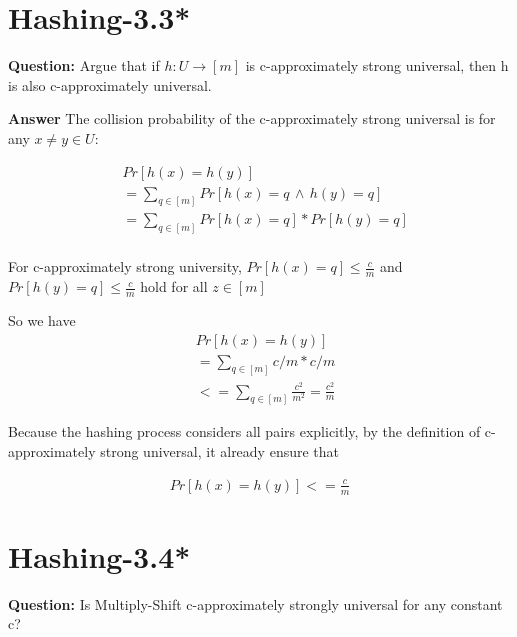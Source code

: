 \documentclass[12pt]{article}
\begin{document}
\section{Hashing-3.3* }
\textbf{Question: }
Argue that if $h: U \rightarrow [m]$ is c-approximately strong universal, then h is also c-approximately universal.

\textbf{Answer}
The collision probability of the c-approximately strong universal is for any $x \neq y \in U$:

\begin{equation}
\begin{aligned}
&Pr[h(x)=h(y)] \\
&= \sum_{q \in [m]} Pr[h(x) = q \, \land \, h(y) = q]\\
&=\sum_{q \in [m]} Pr[h(x) = q] * Pr[h(y) = q]\\
\end{aligned}
\end{equation}

For c-approximately strong university, $Pr[h(x) = q] \leq \frac{c}{m}$ and $Pr[h(y) = q] \leq \frac{c}{m}$ hold for all $z \in [m]$

So we have
\begin{equation}
\begin{aligned}
&Pr[h(x)=h(y)] \\
&= \sum_{q \in [m]} c/m * c/m\\
&<=\sum_{q \in [m]}   \frac{c^2}{m^2}
= \frac{c^2}{m}
\end{aligned}
\end{equation}

Because the hashing process considers all pairs explicitly, by the definition of c-approximately strong universal, it already ensure that 

\begin{equation}
\begin{aligned}
Pr[h(x)=h(y)] <= \frac{c}{m}
\end{aligned}
\end{equation}

\section{Hashing-3.4*}
\textbf{Question:} Is Multiply-Shift c-approximately strongly universal for any constant c?
\end{document}
